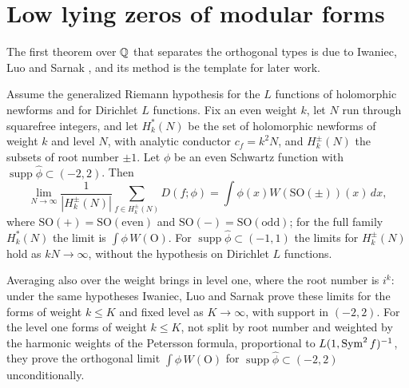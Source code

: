 \section{Low lying zeros of modular forms}\label{sec:ch6ils}

The first theorem over $\mathbb{Q}$ that separates the orthogonal types is due to Iwaniec, Luo and Sarnak \cite{ils2000}, and its method is the template for later work.

\begin{theorem}\label{thm:ch6ils}
Assume the generalized Riemann hypothesis for the $L$ functions of holomorphic newforms and for Dirichlet $L$ functions. Fix an even weight $k$, let $N$ run through squarefree integers, and let $H_k^*(N)$ be the set of holomorphic newforms of weight $k$ and level $N$, with analytic conductor $c_f=k^2N$, and $H_k^\pm(N)$ the subsets of root number $\pm1$. Let $\phi$ be an even Schwartz function with $\operatorname{supp}\hat\phi\subset(-2,2)$. Then
\[
\lim_{N\to\infty}\frac{1}{|H_k^\pm(N)|}\sum_{f\in H_k^\pm(N)}D(f;\phi)=\int\phi(x)W(\mathrm{SO}(\pm))(x)\,dx,
\]
where $\mathrm{SO}(+)=\mathrm{SO(even)}$ and $\mathrm{SO}(-)=\mathrm{SO(odd)}$; for the full family $H_k^*(N)$ the limit is $\int\phi\,W(\mathrm{O})$. For $\operatorname{supp}\hat\phi\subset(-1,1)$ the limits for $H_k^\pm(N)$ hold as $kN\to\infty$, without the hypothesis on Dirichlet $L$ functions.
\end{theorem}

Averaging also over the weight brings in level one, where the root number is $i^k$: under the same hypotheses Iwaniec, Luo and Sarnak prove these limits for the forms of weight $k\le K$ and fixed level as $K\to\infty$, with support in $(-2,2)$. For the level one forms of weight $k\le K$, not split by root number and weighted by the harmonic weights of the Petersson formula, proportional to $L(1,\operatorname{Sym}^2f)^{-1}$, they prove the orthogonal limit $\int\phi\,W(\mathrm{O})$ for $\operatorname{supp}\hat\phi\subset(-2,2)$ unconditionally.


